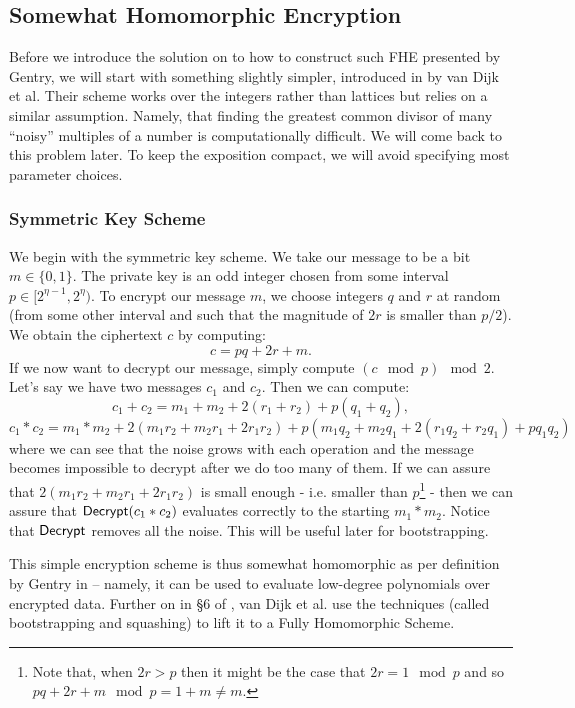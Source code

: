 \subsection{Somewhat Homomorphic Encryption}\label{int_she}
Before we introduce the solution on to how to construct such FHE presented by Gentry, we will start with something slightly simpler, introduced in \cite{int_scheme} by van Dijk et al. Their scheme works over the integers rather than lattices but relies on a similar assumption. Namely, that finding the greatest common divisor of many “noisy” multiples of a number is computationally difficult. We will come back to this problem later. To keep the exposition compact, we will avoid specifying most parameter choices. \\

\subsubsection*{Symmetric Key Scheme}
We begin with the symmetric key scheme. We take our message to be a bit $m \in \{0,1\}$. The private key is an odd integer chosen from some interval $p \in [2^{\eta - 1}, 2^{\eta})$. To encrypt our message $m$, we choose integers $q$ and $r$ at random (from some other interval and such that the magnitude of $2r$ is smaller than $p/2$). We obtain the ciphertext $c$ by computing: 
\begin{equation}c = pq + 2r + m.\end{equation}
If we now want to decrypt our message, simply compute $(c \mod p) \mod 2$. \\
Let's say we have two messages $c_1$ and $c_2$. Then we can compute:
$$ c_1 + c_2 = m_1 + m_2 + 2(r_1 + r_2) + p(q_1 + q_2),$$
$$ c_1 * c_2 = m_1 * m_2 + 2(m_1r_2 + m_2r_1 + 2r_1r_2) + p(m_1q_2 + m_2q_1 + 2(r_1q_2 + r_2q_1) + pq_1q_2)$$
where we can see that the noise grows with each operation and the message becomes impossible to decrypt after we do too many of them. If we can assure that $2(m_1r_2 + m_2r_1 + 2r_1r_2)$ is small enough - i.e. smaller than $p$\footnote{Note that, when $2r > p$ then it might be the case that $2r = 1 \mod p$ and so $pq + 2r + m \mod p = 1 + m \neq m$.} - then we can assure that $\alg{Decrypt}(c_1 * c_2)$ evaluates correctly to the starting $m_1 * m_2$. Notice that $\alg{Decrypt}$ removes all the noise. This will be useful later for bootstrapping.

This simple encryption scheme is thus somewhat homomorphic as per definition by Gentry in \cite{gentry_phd} – namely, it can be used to evaluate low-degree polynomials over encrypted data. Further on in \S 6 of \cite{int_scheme}, van Dijk et al. use the techniques (called bootstrapping and squashing) to lift it to a Fully Homomorphic Scheme. \\

